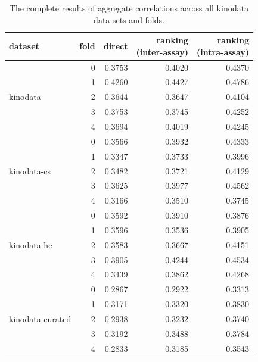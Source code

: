 \begin{table}
\centering
\caption{\label{tab:per-fold-correlations-kinodata}The complete results of aggregate correlations across all kinodata data sets and folds.}
\begin{tabular}{lrrrr}
\toprule
{dataset} & {fold} & {direct} & \makecell[r]{ranking \\ (\textbf{inter}-assay)} & \makecell[r]{ranking \\ (\textbf{intra}-assay)} \\
\midrule
\multirow[t]{5}{*}{kinodata} & 0 & 0.3753 & 0.4020 & 0.4370 \\
 & 1 & 0.4260 & 0.4427 & 0.4786 \\
 & 2 & 0.3644 & 0.3647 & 0.4104 \\
 & 3 & 0.3753 & 0.3745 & 0.4252 \\
 & 4 & 0.3694 & 0.4019 & 0.4245 \\
\cline{1-5}
\multirow[t]{5}{*}{kinodata-cs} & 0 & 0.3566 & 0.3932 & 0.4333 \\
 & 1 & 0.3347 & 0.3733 & 0.3996 \\
 & 2 & 0.3482 & 0.3721 & 0.4129 \\
 & 3 & 0.3625 & 0.3977 & 0.4562 \\
 & 4 & 0.3166 & 0.3510 & 0.3745 \\
\cline{1-5}
\multirow[t]{5}{*}{kinodata-hc} & 0 & 0.3592 & 0.3910 & 0.3876 \\
 & 1 & 0.3596 & 0.3536 & 0.3905 \\
 & 2 & 0.3583 & 0.3667 & 0.4151 \\
 & 3 & 0.3905 & 0.4244 & 0.4534 \\
 & 4 & 0.3439 & 0.3862 & 0.4268 \\
\cline{1-5}
\multirow[t]{5}{*}{kinodata-curated} & 0 & 0.2867 & 0.2922 & 0.3313 \\
 & 1 & 0.3171 & 0.3320 & 0.3830 \\
 & 2 & 0.2938 & 0.3232 & 0.3740 \\
 & 3 & 0.3192 & 0.3488 & 0.3784 \\
 & 4 & 0.2833 & 0.3185 & 0.3543 \\
\bottomrule
\end{tabular}
\end{table}
